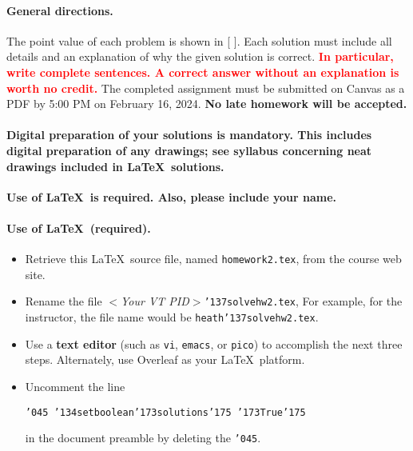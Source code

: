 \documentclass[11pt,twoside]{article}
\newcommand{\mybackslash}{\char'134}
\newcommand{\myleftbracket}{\char'173}
\newcommand{\myrightbracket}{\char'175}
\newcommand{\mypercent}{\char'045}
\newcommand{\myunderscore}{\char'137}
\newcommand{\duedate}{February 16, 2024}
\newcommand{\homeworknumber}{2}
\newcounter{problem}
\begin{document}
{
\begingroup %
\paragraph{General directions.}
The point value of each problem is shown in [ ].
Each solution must include all details and
an explanation of why the given solution is correct.
\textbf{\textcolor{red}{In particular,
write complete sentences.
A correct answer without an explanation is worth no credit.}}
The completed assignment must be submitted on Canvas as a PDF by 5:00 PM
on \duedate.
\textbf{No late homework will be accepted.}

\paragraph{Digital preparation of your solutions is mandatory.
This includes digital preparation of any drawings; see syllabus
concerning neat drawings included in \LaTeX\ solutions.}
\textbf{Use of \LaTeX\ is required.
Also,
please include your name.}

\paragraph{Use of \LaTeX\ (required).}
\begin{itemize}
\item Retrieve this \LaTeX\ source file,
named
\texttt{homework\homeworknumber.tex},
from the course web site.
\item Rename the file
\textit{$<$Your VT PID$>$}\texttt{{\myunderscore}solvehw\homeworknumber.tex},
For example,
for the instructor,
the file name would be
\texttt{heath{\myunderscore}solvehw\homeworknumber.tex}.

\item
Use a \textbf{text editor}
(such as \texttt{vi}, \texttt{emacs}, or \texttt{pico})
to accomplish the next three steps.
Alternately,
use Overleaf as your \LaTeX\ platform.

\item
Uncomment the line

\texttt{{\mypercent} 
{\mybackslash}setboolean{\myleftbracket}solutions{\myrightbracket}%
{\myleftbracket}True{\myrightbracket}}

in the document preamble by deleting the \texttt{\mypercent}.


\end{itemize}}
\end{document}
